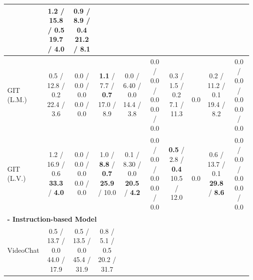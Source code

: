 \begin{table}[h]
{{\begin{tabular}{l|ccc|cccc|cc}
& \makecell[c]{1.2 / 15.8 / 0.5 \\ 19.7 / 4.0}
& \makecell[c]{0.9 / 8.9 / 0.4 \\ \textbf{21.2} / \textbf{8.1}}\\
\toprule
GIT (L.M.) \cite{wang2022git} 
& \makecell[c]{0.5 / 12.8 / 0.2 \\ 22.4 / 3.6}
& \makecell[c]{0.0 / 0.0 / 0.0 \\ 0.0 / 0.0}
& \makecell[c]{\textbf{1.1} / 7.7 / \textbf{0.7} \\ 17.0 / 8.9}

& \makecell[c]{0.0 / 6.40 / 0.0 \\ 14.4 / 3.8}
& \makecell[c]{0.0 / 0.0 / 0.0 \\ 0.0 / 0.0}
& \makecell[c]{0.3 / 1.5 / 0.2 \\ 7.1 / 11.3}
& \makecell[c]{\\ 0.0}

& \makecell[c]{0.2 / 11.2 / 0.1 \\ 19.4 / 8.2}
& \makecell[c]{0.0 / 0.0 / 0.0 \\ 0.0 / 0.0} \\

\toprule
GIT (L.V.) \cite{wang2022git} 
& \makecell[c]{1.2 / 16.9 / 0.6 \\ \textbf{33.3} / \textbf{4.0}}
& \makecell[c]{0.0 / 0.0 / 0.0 \\ 0.0 / 0.0}
& \makecell[c]{1.0 / \textbf{8.8} / \textbf{0.7} \\\textbf{25.9} / 10.0}

& \makecell[c]{0.1 / 8.30 / 0.0 \\ \textbf{20.5} / \textbf{4.2}}
& \makecell[c]{0.0 / 0.0 / 0.0 \\ 0.0 / 0.0}
& \makecell[c]{\textbf{0.5} / 2.8 / \textbf{0.4} \\10.5 / 12.0}
& \makecell[c]{\\ 0.0}

& \makecell[c]{0.6 / 13.7 / 0.1 \\ \textbf{29.8} / \textbf{8.6}}
& \makecell[c]{0.0 / 0.0 / 0.0 \\ 0.0 / 0.0} \\
\midrule
\toprule
\multicolumn{10}{l}{\textbf{- Instruction-based Model}} \\
VideoChat \cite{2023videochat} 
& \makecell[c]{0.5 / 13.7 / 0.0 \\44.0 / 17.9}
& \makecell[c]{0.5 / 13.5 / 0.0 \\45.4 / 31.9}
& \makecell[c]{0.8 / 5.1 / 0.5 \\20.2 / 31.7}


\end{tabular}}}
\end{table}
